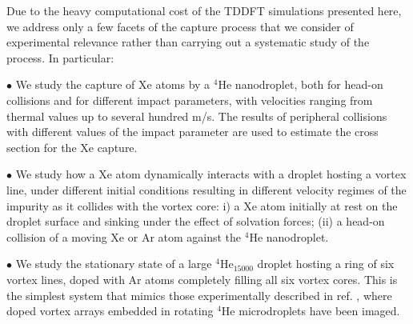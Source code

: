 Due to the heavy computational cost 
of the TDDFT simulations presented here, 
we  address only a few facets of the capture 
process that we consider of experimental relevance
rather than carrying out a systematic study of the process. In particular:

$\bullet$ We study the capture of Xe atoms by a $^4$He nanodroplet, both for head-on 
collisions and for different impact parameters,
with velocities ranging from thermal values up to several hundred m/s.
The results of peripheral collisions  
with different values of the impact parameter 
are used to estimate the cross section for the
Xe capture.
 
$\bullet$ We study how a Xe atom dynamically interacts with a 
droplet hosting a vortex line, under different initial conditions
resulting in different velocity regimes of the impurity as it 
collides with the vortex core:
i) a Xe atom initially at rest on the droplet surface and
sinking under the effect of solvation forces;
(ii) a head-on collision of a moving Xe or Ar atom  against the
$^4$He nanodroplet.

$\bullet$ We study the stationary state of 
a large $^4$He$_{15000}$ 
droplet hosting a ring of six vortex lines, doped with 
Ar atoms completely filling all six vortex cores. This is the simplest system that mimics those
experimentally described in ref. \cite{Gom14}, where 
doped vortex arrays embedded in rotating $^4$He microdroplets have been imaged.
 


